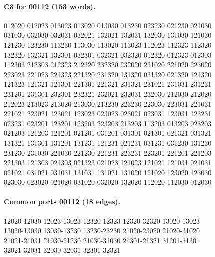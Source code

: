 \documentclass[11pt]{article}
\theoremstyle{remark}
\numberwithin{equation}{section}
\begin{document}
\paragraph{C3 for 00112 (153 words).}
\begingroup\small\ttfamily\begin{flushleft}
012020 012023 013023 013020 013030 013230 023230 021230 021030\\
031030 032030 032031 032021 132021 132031 132030 131030 121030\\
121230 123230 113230 113030 113020 113023 112023 112323 112320\\
132320 132321 132301 032301 032321 032320 012320 012323 012303\\
112303 212303 212323 212320 232320 232020 231020 221020 223020\\
223023 221023 221323 221320 231320 131320 031320 021320 121320\\
121323 121321 121301 221301 221321 231321 231021 231031 231231\\
231201 231301 232301 232321 232021 232031 232030 212030 212020\\
212023 213023 213020 213030 213230 223230 223030 223031 221031\\
221021 223021 123021 123023 023023 023021 023031 123031 123231\\
023231 023201 123201 123203 223203 213203 113203 013203 023203\\
021203 121203 121201 021201 031201 031301 021301 021321 031321\\
131321 131301 131201 131231 121231 021231 031231 031230 131230\\
231230 231030 221030 221230 221231 223231 223201 221201 221203\\
221303 121303 021303 021323 021023 121023 121021 121031 021031\\
021021 031021 031031 131031 131021 131020 121020 123020 123030\\
023030 023020 021020 031020 032020 132020 112020 112030 012030\\
\end{flushleft}\endgroup
\paragraph{Common ports 00112 (18 edges).}
\begingroup\small\ttfamily\begin{flushleft}
12020-12030 12023-13023 12320-12323 12320-32320 13020-13023\\
13020-13030 13030-13230 13230-23230 21020-23020 21020-31020\\
21021-21031 21030-21230 21030-31030 21301-21321 31201-31301\\
32021-32031 32030-32031 32301-32321\\
\end{flushleft}\endgroup
\end{document}
